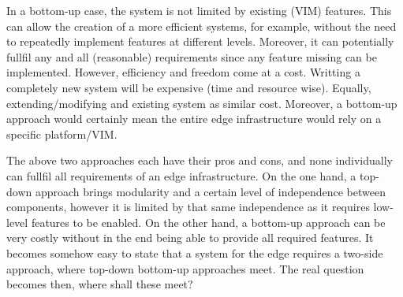 

In a bottom-up case, the system is not limited by existing (VIM) features. This can allow the creation of a more efficient systems, for example, without the need to repeatedly implement features at different levels. Moreover, it can potentially fullfil any and all (reasonable) requirements since any feature missing can be implemented. 
However, efficiency and freedom come at a cost. Writting a completely new system will be expensive (time and resource wise). Equally, extending/modifying and existing system as similar cost. Moreover, a bottom-up approach would certainly mean the entire edge infrastructure would rely on a specific platform/VIM. 




The above two approaches each have their pros and cons, and none individually can fullfil all requirements of an edge infrastructure. On the one hand, a top-down approach brings modularity and a certain level of independence between components, however it is limited by that same independence as it requires low-level features to be enabled. On the other hand, a bottom-up approach can be very costly without in the end being able to provide all required features. It becomes somehow easy to state that a system for the edge requires a two-side approach, where top-down bottom-up approaches meet. The real question becomes then, where shall these meet?

